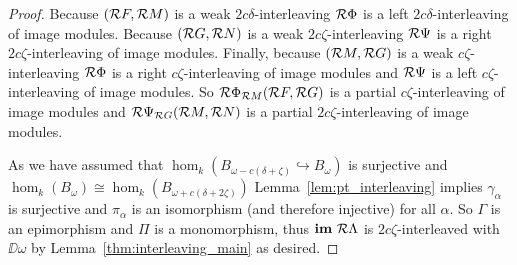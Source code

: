 \begin{proof}
  Because $(\mathcal{R} F,\mathcal{R} M)$ is a weak $2c\delta$-interleaving $\mathcal{R} \Phi$ is a left $2c\delta$-interleaving of image modules.
  Because $(\mathcal{R} G, \mathcal{R} N)$ is a weak $2c\zeta$-interleaving $\mathcal{R} \Psi$ is a right $2c\zeta$-interleaving of image modules.
  Finally, because $(\mathcal{R} M, \mathcal{R} G)$ is a weak $c\zeta$-interleaving $\mathcal{R} \Phi$ is a right $c\zeta$-interleaving of image modules and $\mathcal{R} \Psi$ is a left $c\zeta$-interleaving of image modules.
  So $\mathcal{R} \Phi_{\mathcal{R} M}(\mathcal{R} F, \mathcal{R} G)$ is a partial $c\zeta$-interleaving of image modules and $\mathcal{R} \Psi_{\mathcal{R} G} (\mathcal{R} M,\mathcal{R} N)$ is a partial $2c\zeta$-interleaving of image modules.

  As we have assumed that $\hom_k(B_{\omega-c(\delta+\zeta)}\hookrightarrow B_\omega)$ is surjective and $\hom_k(B_\omega)\cong\hom_k(B_{\omega+c(\delta+2\zeta)})$ Lemma~\ref{lem:pt_interleaving} implies $\gamma_\alpha$ is surjective and $\pi_\alpha$ is an isomorphism (and therefore injective) for all $\alpha$.
  So $\Gamma$ is an epimorphism and $\Pi$ is a monomorphism, thus $\mathbf{im}~\mathcal{R}\Lambda$ is $2c\zeta$-interleaved with $\DD{\omega}$ by Lemma~\ref{thm:interleaving_main} as desired.
\end{proof}


